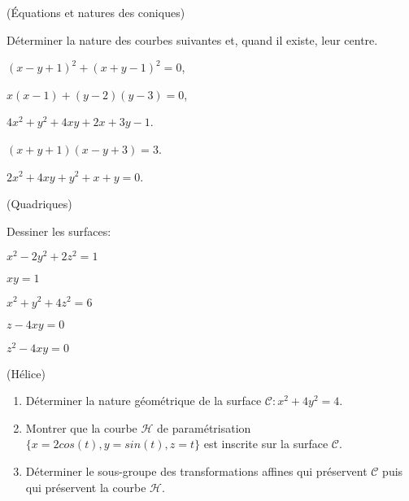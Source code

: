 \documentclass[a4paper,12pt,reqno]{amsart}
\begin{document}
\begin{exo} (Équations et natures des coniques)

  Déterminer la nature des courbes suivantes et, quand il existe, leur centre.
  \begin{examplescol}{2}
    \item $(x-y+1)^2+(x+y-1)^2=0$,
    \item $x(x-1)+(y-2)(y-3)=0$,
    \item $4x^{2}+y^{2}+4xy+2x+3y-1$.
    \item $(x+y+1)(x-y+3)=3$.
    \item $2x^{2}+4xy+y^{2}+x+y=0$.
  \end{examplescol}

\end{exo}


\begin{exo} (Quadriques)

  Dessiner les surfaces:
  \begin{examplescol}{2}
    \item $x^2-2y^2+2z^2=1$
    \item $xy=1$
    \item $x^2+y^2+4z^2=6$
    \item $z-4xy=0$
    \item $z^2-4xy=0$
  \end{examplescol}

\end{exo}


\begin{exo} (Hélice)

  \begin{enumerate}
    \item Déterminer la nature géométrique de la surface $\mathcal{C}:x^2+4y ^2=4$.
    \item Montrer que la courbe $\mathcal{H}$ de paramétrisation $\{x=2cos(t), y= sin(t), z=t\}$ est inscrite sur la surface $\mathcal{C}$.
    \item Déterminer le sous-groupe des transformations affines qui préservent $\mathcal{C}$ puis qui préservent la courbe $\mathcal{H}$.
  \end{enumerate}

\end{exo}
\end{document}
